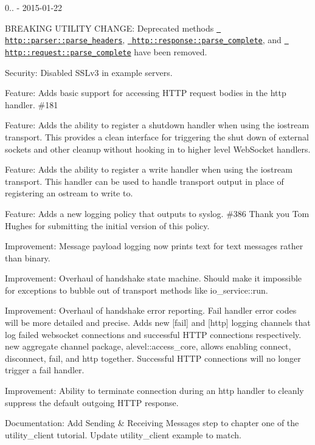 0.. -\/ 2015-\/01-\/22
\begin{DoxyItemize}
\item BREAKING UTILITY CHANGE\+: Deprecated methods {\ttfamily \href{http::parser::parse_headers}{\texttt{ http\+::parser\+::parse\+\_\+headers}}}, {\ttfamily \href{http::response::parse_complete}{\texttt{ http\+::response\+::parse\+\_\+complete}}}, and {\ttfamily \href{http::request::parse_complete}{\texttt{ http\+::request\+::parse\+\_\+complete}}} have been removed.
\item Security\+: Disabled SSLv3 in example servers.
\item Feature\+: Adds basic support for accessing HTTP request bodies in the http handler. \#181
\item Feature\+: Adds the ability to register a shutdown handler when using the iostream transport. This provides a clean interface for triggering the shut down of external sockets and other cleanup without hooking in to higher level Web\+Socket handlers.
\item Feature\+: Adds the ability to register a write handler when using the iostream transport. This handler can be used to handle transport output in place of registering an ostream to write to.
\item Feature\+: Adds a new logging policy that outputs to syslog. \#386 Thank you Tom Hughes for submitting the initial version of this policy.
\item Improvement\+: Message payload logging now prints text for text messages rather than binary.
\item Improvement\+: Overhaul of handshake state machine. Should make it impossible for exceptions to bubble out of transport methods like {\ttfamily io\+\_\+service\+::run}.
\item Improvement\+: Overhaul of handshake error reporting. Fail handler error codes will be more detailed and precise. Adds new \mbox{[}fail\mbox{]} and \mbox{[}http\mbox{]} logging channels that log failed websocket connections and successful HTTP connections respectively.  new aggregate channel package, {\ttfamily alevel\+::access\+\_\+core}, allows enabling connect, disconnect, fail, and http together. Successful HTTP connections will no longer trigger a fail handler.
\item Improvement\+: Ability to terminate connection during an http handler to cleanly suppress the default outgoing HTTP response.
\item Documentation\+: Add Sending \& Receiving Messages step to chapter one of the {\ttfamily utility\+\_\+client} tutorial. Update {\ttfamily utility\+\_\+client} example to match.

\end{DoxyItemize}
